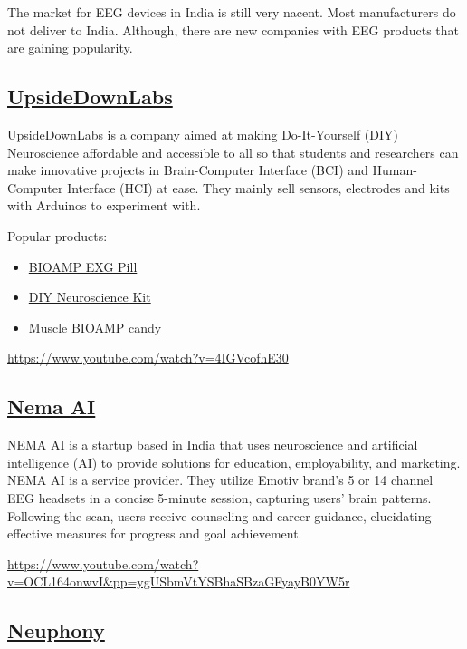 \documentclass[
  letterpaper,
  DIV=11,
  numbers=noendperiod]{scrreprt}
\begin{document}
The market for EEG devices in India is still very nacent. Most
manufacturers do not deliver to India. Although, there are new companies
with EEG products that are gaining popularity.

\subsection{\texorpdfstring{\href{https://upsidedownlabs.tech/}{UpsideDownLabs}}{UpsideDownLabs}}\label{upsidedownlabs}

UpsideDownLabs is a company aimed at making Do-It-Yourself (DIY)
Neuroscience affordable and accessible to all so that students and
researchers can make innovative projects in Brain-Computer Interface
(BCI) and Human-Computer Interface (HCI) at ease. They mainly sell
sensors, electrodes and kits with Arduinos to experiment with.

Popular products:

\begin{itemize}
\item
  \href{https://store.upsidedownlabs.tech/product/bioamp-exg-pill/}{BIOAMP
  EXG Pill}
\item
  \href{https://store.upsidedownlabs.tech/product/diy-neuroscience-kit-pro/}{DIY
  Neuroscience Kit}
\item
  \href{https://store.upsidedownlabs.tech/product/muscle-bioamp-candy/}{Muscle
  BIOAMP candy}
\end{itemize}

\url{https://www.youtube.com/watch?v=4IGVcofhE30}

\subsection{\texorpdfstring{\href{https://nemaai.com/}{Nema
AI}}{Nema AI}}\label{nema-ai}

NEMA AI is a startup based in India that uses neuroscience and
artificial intelligence (AI) to provide solutions for education,
employability, and marketing. NEMA AI is a service provider. They
utilize Emotiv brand's 5 or 14 channel EEG headsets in a concise
5-minute session, capturing users' brain patterns. Following the scan,
users receive counseling and career guidance, elucidating effective
measures for progress and goal achievement.

\url{https://www.youtube.com/watch?v=OCL164onwvI&pp=ygUSbmVtYSBhaSBzaGFyayB0YW5r}

\subsection{\texorpdfstring{\href{https://neuphony.com/}{Neuphony}}{Neuphony}}\label{neuphony}
\end{document}
